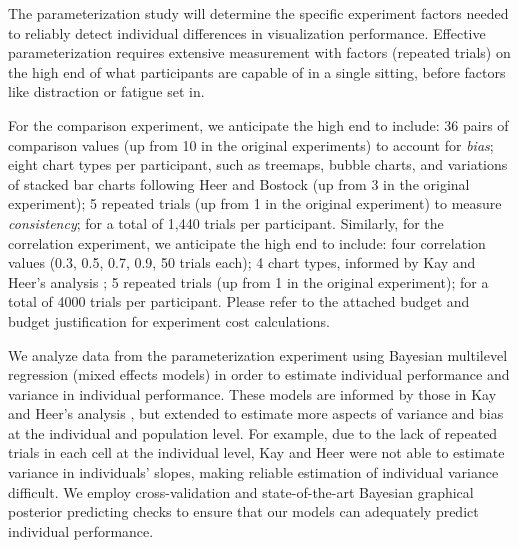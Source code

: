 \documentclass[11pt]{article}
\begin{document}
The parameterization study will determine the specific experiment factors needed to reliably detect individual differences in visualization performance.
Effective parameterization requires extensive measurement with factors (\eg repeated trials) on the high end of what participants are capable of in a single sitting, before factors like distraction or fatigue set in.


For the comparison experiment, we anticipate the high end to include: 36 pairs of comparison values (up from 10 in the original experiments) to account for \emph{bias}; eight chart types per participant, such as treemaps, bubble charts, and variations of stacked bar charts following Heer and Bostock \cite{heer2010crowdsourcing} (up from 3 in the original experiment); 5 repeated trials (up from 1 in the original experiment) to measure \emph{consistency}; for a total of 1,440 trials per participant.
Similarly, for the correlation experiment, we anticipate the high end to include: four correlation values (0.3, 0.5, 0.7, 0.9, 50 trials each); 4 chart types, informed by Kay and Heer's analysis \cite{kay2016beyond}; 5 repeated trials (up from 1 in the original experiment); for a total of 4000 trials per participant.
Please refer to the attached budget and budget justification for experiment cost calculations.

We analyze data from the parameterization experiment using Bayesian multilevel regression \cite{gelman2007mlm} (\ie mixed effects models) in order to estimate individual performance and variance in individual performance. These models are informed by those in Kay and Heer's analysis \cite{kay2016beyond}, but extended to estimate more aspects of variance and bias at the individual and population level. For example, due to the lack of repeated trials in each cell at the individual level, Kay and Heer were not able to estimate variance in individuals' slopes, making reliable estimation of individual variance difficult. We employ cross-validation \cite{vehtari2017practical} and state-of-the-art Bayesian graphical posterior predicting checks \cite{gabry2017visualization} to ensure that our models can adequately predict individual performance.
\end{document}
